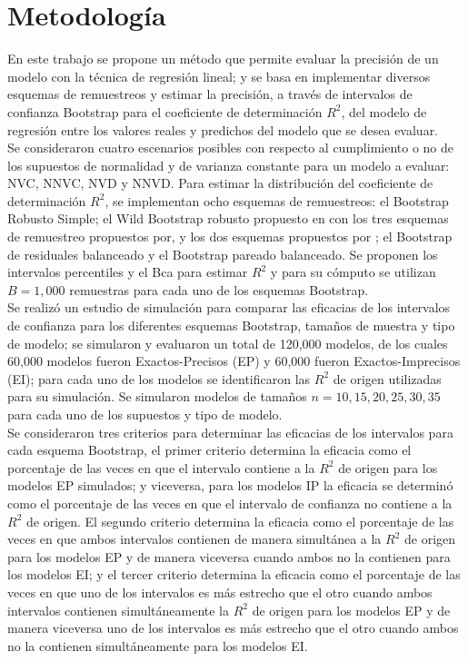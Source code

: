\section{Metodología}
En este trabajo se propone un método que permite evaluar la precisión de un modelo con la técnica de regresión lineal; y se basa en implementar diversos esquemas de remuestreos y estimar la precisión, a través de intervalos de confianza Bootstrap para el coeficiente de determinación $R^2$, del modelo de regresión entre los valores reales y predichos del modelo que se desea evaluar.\\

Se consideraron cuatro escenarios posibles con respecto al cumplimiento o no de los supuestos de normalidad y de varianza constante para un modelo a evaluar: NVC, NNVC, NVD y NNVD. Para estimar la distribución del coeficiente de determinación $R^2$, se implementan ocho esquemas de remuestreos: el Bootstrap Robusto Simple; el Wild Bootstrap robusto propuesto en \textcite{rana-2012} con los tres esquemas de remuestreo propuestos por\textcite{wu-1986}, y los dos esquemas propuestos por \textcite{wu-1986}; el Bootstrap de residuales balanceado y el Bootstrap pareado balanceado. Se proponen los intervalos percentiles y el Bca para estimar $R^2$ y para su cómputo se utilizan $B=1,000$ remuestras para cada uno de los esquemas Bootstrap.\\ 

Se realizó un estudio de simulación para comparar las eficacias de los intervalos de confianza para los diferentes esquemas Bootstrap, tamaños de muestra y tipo de modelo; se simularon y evaluaron un total de 120,000 modelos, de los cuales 60,000 modelos fueron Exactos-Precisos (EP) y 60,000 fueron Exactos-Imprecisos (EI); para cada uno de los modelos se identificaron las $R^2$ de origen utilizadas para su simulación. Se simularon modelos de tamaños $n=10, 15, 20, 25, 30, 35$ para cada uno de los supuestos y tipo de modelo.\\  

Se consideraron tres criterios para determinar las eficacias de los intervalos para cada esquema Bootstrap, el primer criterio determina la eficacia como el porcentaje de las veces en que el intervalo contiene a la $R^2$ de origen para los modelos EP simulados; y viceversa, para los modelos IP la eficacia se determinó como el porcentaje de las veces en que el intervalo de confianza no contiene a la $R^2$ de origen. El segundo criterio determina la eficacia como el porcentaje de las veces en que ambos intervalos contienen de manera simultánea a la $R^2$ de origen para los modelos EP y de manera viceversa cuando ambos no la contienen para los modelos EI; y el tercer criterio determina la eficacia como el porcentaje de las veces en que uno de los intervalos es más estrecho que el otro cuando ambos intervalos contienen simultáneamente la $R^2$ de origen para los modelos EP y de manera viceversa uno de los intervalos es más estrecho que el otro cuando ambos no la contienen simultáneamente para los modelos EI.\\

